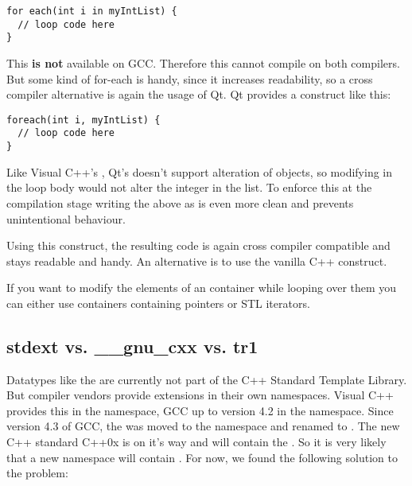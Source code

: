 \begin{verbatim}
for each(int i in myIntList) {
  // loop code here
}
\end{verbatim}

This \textbf{is not} available on GCC. Therefore this cannot compile on both compilers. But some kind of for-each is handy, since it increases readability, so a cross compiler alternative is again the usage of Qt. Qt provides a construct like this:

\begin{verbatim}
foreach(int i, myIntList) {
  // loop code here
}
\end{verbatim}

Like Visual C++'s , Qt's  doesn't support alteration of objects, so modifying  in the loop body would not alter the integer in the list.  To enforce this at the compilation stage writing the above as  is even more clean and prevents unintentional behaviour.

Using this construct, the resulting code is again cross compiler compatible and stays readable and handy. An alternative is to use the vanilla C++  construct. 

If you want to modify the elements of an container while looping over them you can either use containers containing pointers or STL iterators.

\subsection{stdext vs. \_\_gnu\_cxx vs. tr1}

Datatypes like the  are currently not part of the C++ Standard Template Library. But compiler vendors provide extensions in their own namespaces. Visual C++ provides this in the  namespace, GCC up to version 4.2 in the  namespace. Since version 4.3 of GCC, the  was moved to the namespace  and renamed to . The new C++ standard C++0x is on it's way and will contain the . So it is very likely that a new namespace will contain . For now, we found the following solution to the problem:


